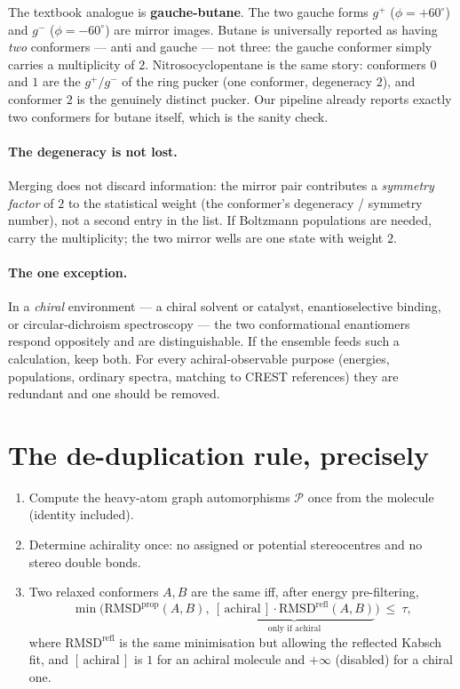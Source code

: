 \documentclass[11pt]{article}
\newcommand{\rmsd}{\mathrm{RMSD}}
\begin{document}
The textbook analogue is \textbf{gauche-butane}. The two gauche forms
$g^{+}$ ($\phi=+60^\circ$) and $g^{-}$ ($\phi=-60^\circ$) are mirror images.
Butane is universally reported as having \emph{two} conformers --- anti and
gauche --- not three: the gauche conformer simply carries a multiplicity of
$2$. Nitrosocyclopentane is the same story: conformers $0$ and $1$ are the
$g^{+}/g^{-}$ of the ring pucker (one conformer, degeneracy $2$), and conformer
$2$ is the genuinely distinct pucker. Our pipeline already reports exactly two
conformers for butane itself, which is the sanity check.

\paragraph{The degeneracy is not lost.} Merging does not discard information:
the mirror pair contributes a \emph{symmetry factor} of $2$ to the statistical
weight (the conformer's degeneracy / symmetry number), not a second entry in
the list. If Boltzmann populations are needed, carry the multiplicity; the two
mirror wells are one state with weight $2$.

\paragraph{The one exception.} In a \emph{chiral} environment --- a chiral
solvent or catalyst, enantioselective binding, or circular-dichroism
spectroscopy --- the two conformational enantiomers respond oppositely and are
distinguishable. If the ensemble feeds such a calculation, keep both. For every
achiral-observable purpose (energies, populations, ordinary spectra, matching
to CREST references) they are redundant and one should be removed.

\section{The de-duplication rule, precisely}

\begin{enumerate}
  \item Compute the heavy-atom graph automorphisms $\mathcal{P}$ once from the
        molecule (identity included).
  \item Determine achirality once: no assigned or potential stereocentres and
        no stereo double bonds.
  \item Two relaxed conformers $A,B$ are the same iff, after energy
        pre-filtering,
        \[
          \min\Big(\rmsd^{\text{prop}}(A,B),\
          \underbrace{[\,\text{achiral}\,]\cdot \rmsd^{\text{refl}}(A,B)}_{\text{only if achiral}}\Big)
          \ \le\ \tau,
        \]
        where $\rmsd^{\text{refl}}$ is the same minimisation but allowing the
        reflected Kabsch fit, and $[\,\text{achiral}\,]$ is $1$ for an achiral
        molecule and $+\infty$ (disabled) for a chiral one.
\end{enumerate}
\end{document}
